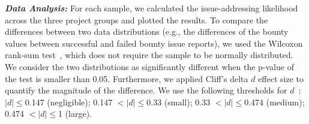 \noindent\emph{\textbf{Data Analysis:}} For each sample, we calculated the issue-addressing likelihood across the three project groups and plotted the results. To compare the differences between two data distributions (e.g., the differences of the bounty values between successful and failed bounty issue reports), we used the Wilcoxon rank-sum test~\cite{bauer1972constructing}, which does not require the sample to be normally distributed. We consider the two distributions as significantly different when the p-value of the test is smaller than 0.05. Furthermore, we applied Cliff's delta $d$ \cite{long2003ordinal} effect size to quantify the magnitude of the difference. We use the following thresholds for $d$~\cite{romano2006appropriate}: $ \vert d \vert \leq$0.147 (negligible); 0.147 $ < \vert d \vert \leq $0.33 (small); 0.33 $ < \vert d \vert \leq $0.474 (medium); 0.474 $ < \vert d \vert  \leq $1 (large).


